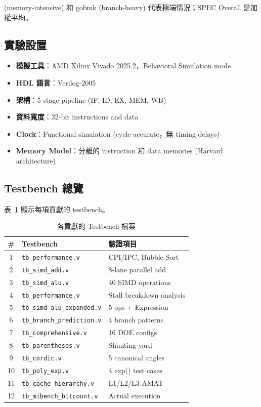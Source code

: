 \documentclass[journal]{IEEEtran}
\begin{document}
\Notemcf (memory-intensive) 和 gobmk (branch-heavy) 代表極端情況；SPEC Overall 是加權平均。

\subsection{實驗設置}
\begin{itemize}
    \item \textbf{模擬工具}：AMD Xilinx Vivado 2025.2，Behavioral Simulation mode
    \item \textbf{HDL 語言}：Verilog-2005
    \item \textbf{架構}：5-stage pipeline (IF, ID, EX, MEM, WB)
    \item \textbf{資料寬度}：32-bit instructions and data
    \item \textbf{Clock}：Functional simulation (cycle-accurate，無 timing delays)
    \item \textbf{Memory Model}：分離的 instruction 和 data memories (Harvard architecture)
\end{itemize}

\subsection{Testbench 總覽}
表~\ref{tab:testbenches} 顯示每項貢獻的 testbench。

\begin{table}[!t]
\centering
\caption{各貢獻的 Testbench 檔案}
\label{tab:testbenches}
\footnotesize
\begin{tabular}{@{}clp{3.5cm}@{}}
\toprule
\textbf{\#} & \textbf{Testbench} & \textbf{驗證項目} \\
\midrule
1 & \texttt{tb\_performance.v} & CPI/IPC, Bubble Sort \\
2 & \texttt{tb\_simd\_add.v} & 8-lane parallel add \\
3 & \texttt{tb\_simd\_alu.v} & 40 SIMD operations \\
4 & \texttt{tb\_performance.v} & Stall breakdown analysis \\
5 & \texttt{tb\_simd\_alu\_expanded.v} & 5 ops + Expression \\
6 & \texttt{tb\_branch\_prediction.v} & 4 branch patterns \\
7 & \texttt{tb\_comprehensive.v} & 16 DOE configs \\
8 & \texttt{tb\_parentheses.v} & Shunting-yard \\
9 & \texttt{tb\_cordic.v} & 5 canonical angles \\
10 & \texttt{tb\_poly\_exp.v} & 4 exp() test cases \\
11 & \texttt{tb\_cache\_hierarchy.v} & L1/L2/L3 AMAT \\
12 & \texttt{tb\_mibench\_bitcount.v} & Actual execution \\
\bottomrule
\end{tabular}
\end{table}
\end{document}
